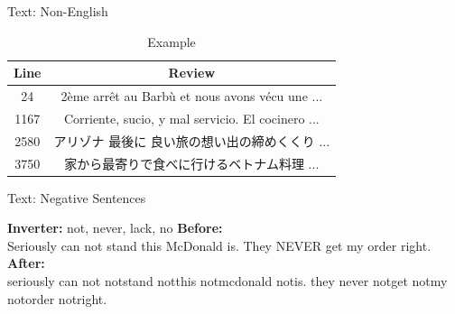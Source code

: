 \documentclass[10pt]{beamer}
\begin{document}


\begin{frame}{Text: Non-English}

\begin{table}[ht]
\caption{Example} %
\centering %
\begin{tabular}{c c} %
\hline %
Line & Review \\ [0.5ex] %

\hline %
24 & 2ème arrêt au Barbù et nous avons vécu une  ... \\  
1167 & Corriente, sucio, y mal servicio. El cocinero  ... \\  
2580 & アリゾナ 最後に 良い旅の想い出の締めくくり  ... \\  
3750 & 家から最寄りで食べに行けるベトナム料理 ...  \\  
\hline %
\end{tabular}
\label{table:nonlin} %
\end{table}
\end{frame}



\begin{frame}{Text: Negative Sentences}

\textbf{Inverter: } not, never, lack, no
\newline
\newline
\textbf{Before:}\\
Seriously can not stand this McDonald is. They NEVER get my order right.
\newline
\newline
\textbf{After:}\\
seriously can not notstand notthis notmcdonald notis. they never notget notmy notorder notright.\\

\end{frame}
\end{document}
